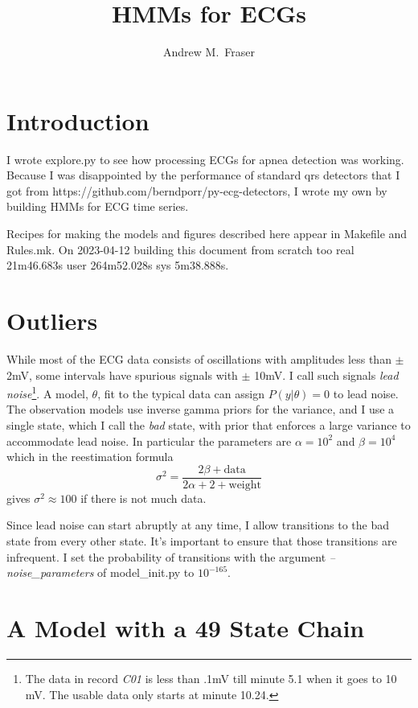\documentclass[12pt]{article}
\title{HMMs for ECGs}
\author{Andrew M.\ Fraser}
\begin{document}
\maketitle

\section{Introduction}
\label{sec:introduction}

I wrote explore.py to see how processing ECGs for apnea detection was
working.  Because I was disappointed by the performance of standard qrs
detectors that I got from
https://github.com/berndporr/py-ecg-detectors, I wrote my own by
building HMMs for ECG time series.

Recipes for making the models and figures described here appear in
Makefile and Rules.mk.  On 2023-04-12 building this document from
scratch too real 21m46.683s user 264m52.028s sys 5m38.888s.

\section{Outliers}
\label{sec:outliers}

While most of the ECG data consists of oscillations with amplitudes
less than $\pm$ 2mV, some intervals have spurious signals with $\pm$
10mV.  I call such signals \emph{lead noise}\footnote{The data in
  record \emph{C01} is less than .1mV till minute 5.1 when it goes to
  10 mV.  The usable data only starts at minute 10.24.}.  A model,
$\theta$, fit to the typical data can assign $P(y|\theta) = 0$ to lead
noise.  The observation models use inverse gamma priors for the
variance, and I use a single state, which I call the \emph{bad} state,
with prior that enforces a large variance to accommodate lead noise.
In particular the parameters are $\alpha=10^{2}$ and $\beta=10^{4}$
which in the reestimation formula
\begin{equation*}
  \sigma^2 = \frac{2 \beta + \text{data}}{2 \alpha +2 + \text{weight}}
\end{equation*}
gives $\sigma^2 \approx 100$ if there is not much data.

Since lead noise can start abruptly at any time, I allow transitions
to the bad state from every other state.  It's important to ensure
that those transitions are infrequent.  I set the probability of
transitions with the argument \emph{--noise\_parameters} of
model\_init.py to $10^{-165}$.

\section{A Model with a 49 State Chain}
\label{sec:mono20}
\end{document}
